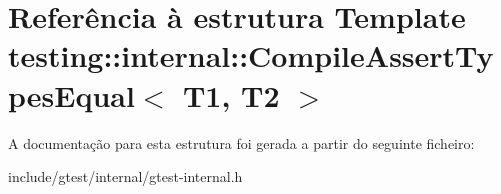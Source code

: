 \hypertarget{structtesting_1_1internal_1_1CompileAssertTypesEqual}{\section{Referência à estrutura Template testing\-:\-:internal\-:\-:Compile\-Assert\-Types\-Equal$<$ T1, T2 $>$}
\label{structtesting_1_1internal_1_1CompileAssertTypesEqual}
}


A documentação para esta estrutura foi gerada a partir do seguinte ficheiro\-:\begin{DoxyCompactItemize}
\item 
include/gtest/internal/gtest-\/internal.\-h\end{DoxyCompactItemize}
